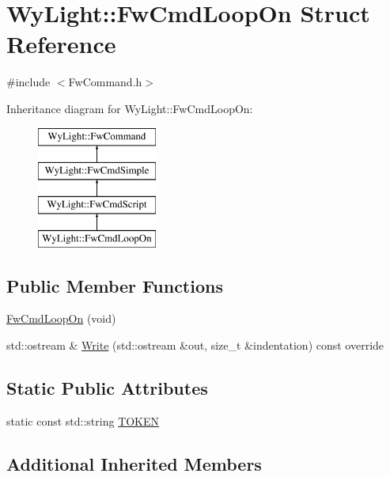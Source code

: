 \hypertarget{struct_wy_light_1_1_fw_cmd_loop_on}{\section{Wy\-Light\-:\-:Fw\-Cmd\-Loop\-On Struct Reference}
\label{struct_wy_light_1_1_fw_cmd_loop_on}
}


{\ttfamily \#include $<$Fw\-Command.\-h$>$}

Inheritance diagram for Wy\-Light\-:\-:Fw\-Cmd\-Loop\-On\-:\begin{figure}[H]
\begin{center}
\leavevmode
\includegraphics[height=4.000000cm]{struct_wy_light_1_1_fw_cmd_loop_on}
\end{center}
\end{figure}
\subsection*{Public Member Functions}
\begin{DoxyCompactItemize}
\item 
\hyperlink{struct_wy_light_1_1_fw_cmd_loop_on_a968bf50635e94bba35d52d2552a05cbd}{Fw\-Cmd\-Loop\-On} (void)
\item 
std\-::ostream \& \hyperlink{struct_wy_light_1_1_fw_cmd_loop_on_a07f681b0fff3b0a64017f63d1d8dfc5d}{Write} (std\-::ostream \&out, size\-\_\-t \&indentation) const override
\end{DoxyCompactItemize}
\subsection*{Static Public Attributes}
\begin{DoxyCompactItemize}
\item 
static const std\-::string \hyperlink{struct_wy_light_1_1_fw_cmd_loop_on_a58017e94f9a612a0288a010729a8e4cb}{T\-O\-K\-E\-N}
\end{DoxyCompactItemize}
\subsection*{Additional Inherited Members}


